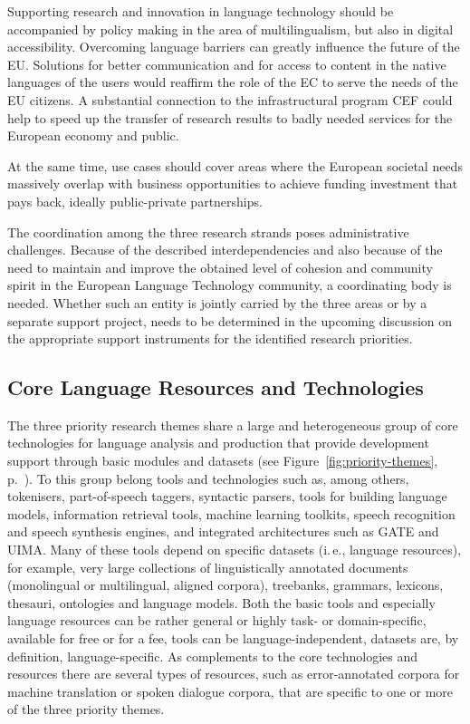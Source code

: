 \documentclass[10pt, plain]{../../metanetpaper}
\begin{document}
\begin{multicols}{2}
Supporting research and innovation in language technology should be accompanied by policy making in the area of multilingualism, but also in digital accessibility. Overcoming language barriers can greatly influence the future of the EU. Solutions for better communication and for access to content in the native languages of the users would reaffirm the role of the EC to serve the needs of the EU citizens. A substantial connection to the infrastructural program CEF could help to speed up the transfer of research results to badly needed services for the European economy and public.
 
At the same time, use cases should cover areas where the European societal needs massively overlap with business opportunities to achieve funding investment that pays back, ideally public-private partnerships.
 
The coordination among the three research strands poses administrative challenges. Because of the described interdependencies and also because of the need to maintain and improve the obtained level of cohesion and community spirit in the European Language Technology community, a coordinating body is needed. Whether such an entity is jointly carried by the three areas or by a separate support project, needs to be determined in the upcoming discussion on the appropriate support instruments for the identified research priorities.

\subsection{Core Language Resources and Technologies}
\label{sec:sharing-resources-and-results}


The three priority research themes share a large and heterogeneous group of core technologies for language analysis and production that provide development support through basic modules and datasets (see Figure~\ref{fig:priority-themes}, p.~\pageref{fig:priority-themes}). To this group belong tools and technologies such as, among others, tokenisers, part-of-speech taggers, syntactic parsers, tools for building language models, information retrieval tools, machine learning toolkits, speech recognition and speech synthesis engines, and integrated architectures such as GATE and UIMA. Many of these tools depend on specific datasets (i.\,e., language resources), for example, very large collections of linguistically annotated documents (monolingual or multilingual, aligned corpora), treebanks, grammars, lexicons, thesauri, ontologies and language models. Both the basic tools and especially language resources can be rather general or highly task- or domain-specific, available for free or for a fee, tools can be language-independent, datasets are, by definition, language-specific. As complements to the core technologies and resources there are several types of resources, such as error-annotated corpora for machine translation or spoken dialogue corpora, that are specific to one or more of the three priority themes.


\end{multicols}
\end{document}
